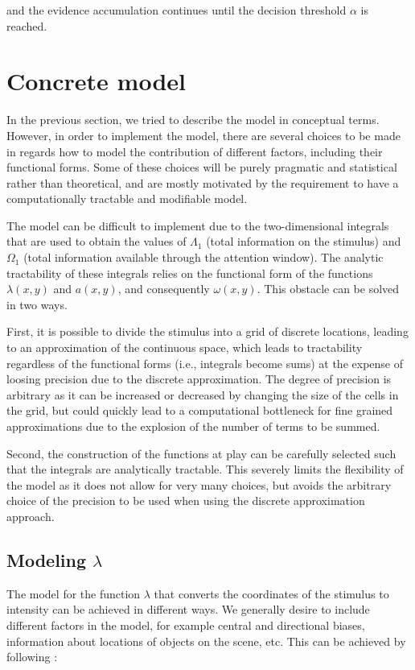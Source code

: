 \documentclass{article}
\begin{document}
and the evidence accumulation continues until the decision threshold $\alpha$ is reached.

\section{Concrete model}

In the previous section, we tried to describe the model in conceptual terms. However, in order to implement the model, there are several choices to be made in regards how to model the contribution of different factors, including their functional forms. Some of these choices will be purely pragmatic and statistical rather than theoretical, and are mostly motivated by the requirement to have a computationally tractable and modifiable model.

The model can be difficult to implement due to the two-dimensional integrals that are used to obtain the values of $\Lambda_1$ (total information on the stimulus) and $\Omega_1$ (total information available through the attention window). The analytic tractability of these integrals relies on the functional form of the functions $\lambda(x, y)$ and $a(x, y)$, and consequently $\omega(x, y)$. This obstacle can be solved in two ways. 

First, it is possible to divide the stimulus into a grid of discrete locations, leading to an approximation of the continuous space, which leads to tractability regardless of the functional forms (i.e., integrals become sums) at the expense of loosing precision due to the discrete approximation. The degree of precision is arbitrary as it can be increased or decreased by changing the size of the cells in the grid, but could quickly lead to a computational bottleneck for fine grained approximations due to the explosion of the number of terms to be summed.

Second, the construction of the functions at play can be carefully selected such that the integrals are analytically tractable. This severely limits the flexibility of the model as it does not allow for very many choices, but avoids the arbitrary choice of the precision to be used when using the discrete approximation approach.


\subsection{Modeling $\lambda$}

The model for the function $\lambda$ that converts the coordinates of the stimulus to intensity can be achieved in different ways. We generally desire to include different factors in the model, for example central and directional biases, information about locations of objects on the scene, etc. This can be achieved by following \citep{barthelme2013spatial}:
\end{document}
